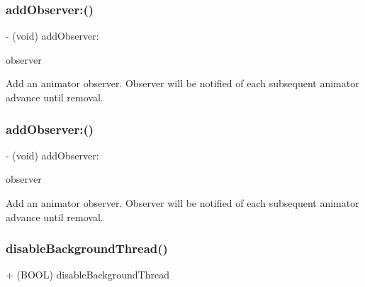 \subsubsection{\texorpdfstring{add\+Observer\+:()}{addObserver:()}\hspace{0.1cm}{\footnotesize\ttfamily [1/2]}}
{\footnotesize\ttfamily -\/ (void) add\+Observer\+: \begin{DoxyParamCaption}\item[{(id$<$ P\+O\+P\+Animator\+Observing $>$)}]{observer }\end{DoxyParamCaption}\hspace{0.3cm}{\ttfamily [implementation]}}

Add an animator observer. Observer will be notified of each subsequent animator advance until removal. \mbox{\label{interface_p_o_p_animator_a5384718da6fd07fcaa8465d4ef79fd2f}} 
\subsubsection{\texorpdfstring{add\+Observer\+:()}{addObserver:()}\hspace{0.1cm}{\footnotesize\ttfamily [2/2]}}
{\footnotesize\ttfamily -\/ (void) add\+Observer\+: \begin{DoxyParamCaption}\item[{(id$<$ P\+O\+P\+Animator\+Observing $>$)}]{observer }\end{DoxyParamCaption}\hspace{0.3cm}{\ttfamily [implementation]}}

Add an animator observer. Observer will be notified of each subsequent animator advance until removal. \mbox{\label{interface_p_o_p_animator_a4c3d7e7c7d6bef1865ae24f49c69615b}} 
\subsubsection{\texorpdfstring{disable\+Background\+Thread()}{disableBackgroundThread()}\hspace{0.1cm}{\footnotesize\ttfamily [1/2]}}
{\footnotesize\ttfamily + (B\+O\+OL) disable\+Background\+Thread \begin{DoxyParamCaption}{ }\end{DoxyParamCaption}\hspace{0.3cm}{\ttfamily [implementation]}}

